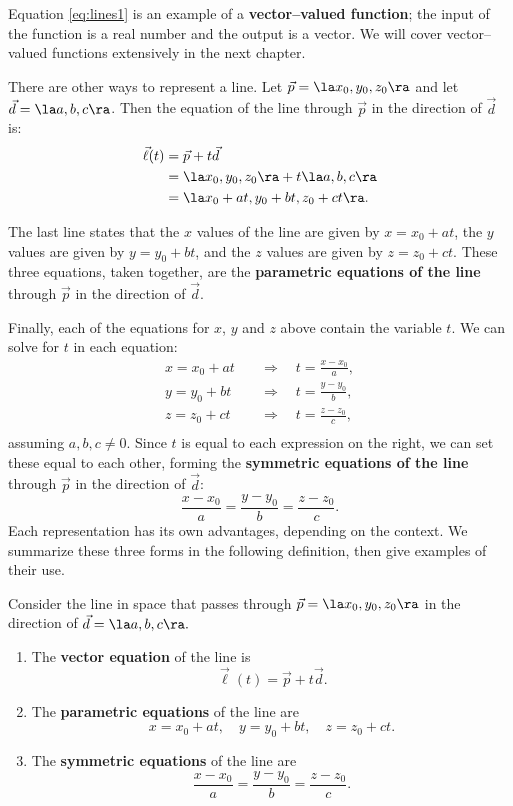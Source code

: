 Equation \eqref{eq:lines1} is an example of a \textbf{vector--valued function}; the input of the function is a real number and the output is a vector. We will cover vector--valued functions extensively in the next chapter.

There are other ways to represent a line. Let $\vec p = \la x_0,y_0,z_0\ra$ and let $\vec d = \la a,b,c\ra$. Then the equation of the line through $\vec p$ in the direction of $\vec d$ is:
\begin{align*}
\vec\ell(t) &= \vec p + t\vec d \\
						&= \la x_0,y_0,z_0\ra + t\la a,b,c\ra \\
						&= \la x_0 + at, y_0+bt, z_0+ct\ra.
\end{align*}

The last line states that the $x$ values of the line are given by $x=x_0+at$, the $y$ values are given by $y = y_0+bt$, and the $z$ values are given by $z = z_0 + ct$. These three equations, taken together, are the \textbf{parametric equations of the line} through $\vec p$ in the direction of $\vec d$.

Finally, each of the equations for $x$, $y$ and $z$ above contain the variable $t$. We can solve for $t$ in each equation:
\begin{align*}
x = x_0+at \quad&\Rightarrow\quad t=\frac{x-x_0}{a},\\
y=y_0+bt \quad&\Rightarrow\quad t = \frac{y-y_0}{b},\\
z = z_0+ct \quad&\Rightarrow\quad t = \frac{z-z_0}{c},\\
\end{align*}
assuming $a,b,c\neq 0$.
Since $t$ is equal to each expression on the right, we can set these equal to each other, forming the \textbf{symmetric equations of the line} through $\vec p$ in the direction of $\vec d$:
\[
\frac{x-x_0}{a} = \frac{y-y_0}{b}=\frac{z-z_0}{c}.
\]
Each representation has its own advantages, depending on the context. We summarize these three forms in the following definition, then give examples of their use.

{Consider the line in space that passes through $\vec p = \la x_0,y_0,z_0\ra$ in the direction of $\vec d = \la a,b,c\ra.$
\begin{enumerate}
	\item The \textbf{vector equation} of the line is 
	\[
	\vec \ell(t) = \vec p+t\vec d.
	\]
	\item	The \textbf{parametric equations} of the line are
	\[
	x = x_0+at, \quad y=y_0+bt, \quad z = z_0+ct .
	\]
	\item	The \textbf{symmetric equations} of the line are
	\[
	\frac{x-x_0}{a} = \frac{y-y_0}{b}=\frac{z-z_0}{c}.
	\]
\end{enumerate}
}

